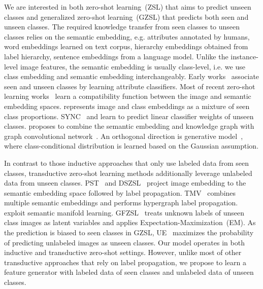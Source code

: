 \documentclass[10pt,twocolumn,letterpaper]{article}
\newcommand{\myparagraph}[1]{\vspace{5pt}\noindent{\bf #1}}
\begin{document}
\myparagraph{Zero-shot Learning.} We are interested in both zero-shot learning~(ZSL) that aims to predict unseen classes and generalized zero-shot learning~(GZSL) that predicts both seen and unseen classes. The required knowledge transfer from seen classes to unseen classes relies on the semantic embedding, e.g. attributes annotated by humans, word embeddings learned on text corpus, hierarchy embeddings obtained from label hierarchy, sentence embeddings from a language model. Unlike the instance-level image features, the semantic embedding is usually class-level, i.e. we use class embedding and semantic embedding interchangeably. 
Early works~\cite{LNH13,jayaraman2014zero} associate seen and unseen classes by learning attribute classifiers. 
Most of recent zero-shot learning works~\cite{APHS13,kodirov2017semantic,RT15,FCSBDRM13,zhang2016learning} learn a compatibility function between the image and semantic embedding spaces.  
\cite{ZV15,NMBSSFCD14,CCGS16} represents image and class embeddings as a mixture of seen class proportions. SYNC~\cite{CCGS16} and \cite{ESE13,lei2015predicting} learn to predict linear classifier weights of unseen classes. \cite{Wang_2018_CVPR} proposes to combine the semantic embedding and knowledge graph with graph convolutional network~\cite{kipf2016semi}. An orthogonal direction is generative model~\cite{verma2017simple, mukherjee2016gaussian}, where class-conditional distribution is learned based on the Gaussian assumption.  

In contrast to those inductive approaches that only use labeled data from seen classes, transductive zero-shot learning methods additionally leverage unlabeled data from unseen classes. PST~\cite{MES13} and DSZSL~\cite{ye2017zero} project image embedding to the semantic embedding space followed by label propagation. TMV~\cite{FHXFG15} combines multiple semantic embeddings and performs hypergraph label propagation. 
\cite{KXFG15, fu2016semi} exploit semantic manifold learning. GFZSL~\cite{verma2017simple} treats unknown labels of unseen class images as latent variables and applies Expectation-Maximization~(EM). As the prediction is biased to seen classes in GZSL, UE~\cite{song2018transductive} maximizes the probability of predicting unlabeled images as unseen classes. Our model operates in both inductive and transductive zero-shot settings. However, unlike most of other transductive approaches that rely on label propagation, we propose to learn a feature generator with labeled data of seen classes and unlabeled data of unseen classes. 
\end{document}
